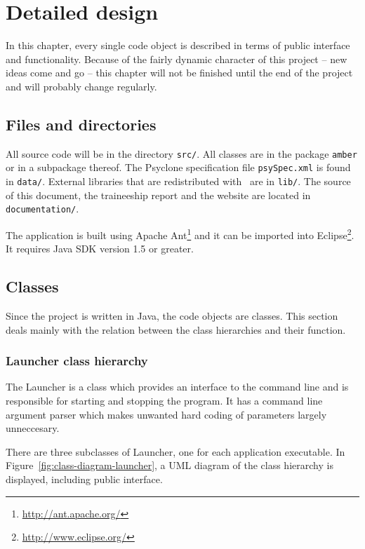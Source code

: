 \chapter{Detailed design}

In this chapter, every single code object is described in terms of public
interface and functionality. Because of the fairly dynamic character of this
project -- new ideas come and go -- this chapter will not be finished until the
end of the project and will probably change regularly.

\section{Files and directories}

All source code will be in the directory \texttt{src/}. All classes are in the
package \texttt{amber} or in a subpackage thereof. The Psyclone specification
file \texttt{psySpec.xml} is found in \texttt{data/}. External libraries that
are redistributed with \Amber\ are in \texttt{lib/}. The source of this
document, the traineeship report and the website are located in
\texttt{documentation/}.

The application is built using Apache
Ant\footnote{\url{http://ant.apache.org/}} and it can be imported into
Eclipse\footnote{\url{http://www.eclipse.org/}}. It requires Java SDK version
1.5 or greater.

\section{Classes}

Since the project is written in Java, the code objects are classes. This
section deals mainly with the relation between the class hierarchies and their
function.

\subsection{Launcher class hierarchy}

The Launcher is a class which provides an interface to the command line and is
responsible for starting and stopping the program. It has a command line
argument parser which makes unwanted hard coding of parameters largely
unneccesary.

There are three subclasses of Launcher, one for each application executable. In
Figure~\ref{fig:class-diagram-launcher}, a UML diagram of the class hierarchy
is displayed, including public interface.

